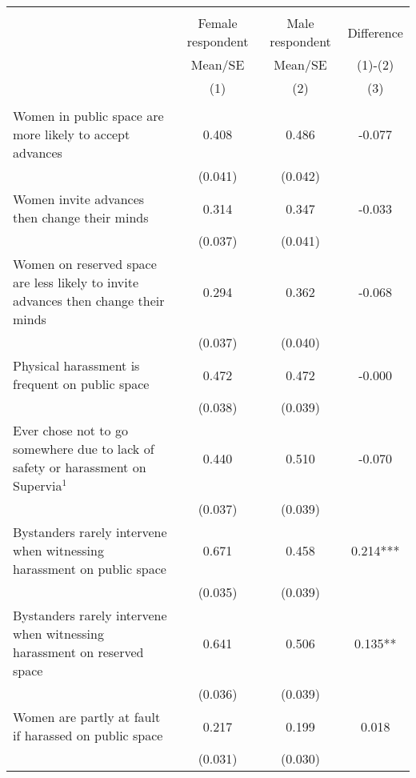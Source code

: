


\begin{tabular}{lccc} \hline\hline \\[-1.8ex]
 & Female respondent & Male respondent & Difference \\
 & Mean/SE & Mean/SE & (1)-(2) \\
 & (1) & (2) & (3) \\ \hline\\[-1.8ex]
Women in public space are more likely to accept advances & 0.408 & 0.486 & -0.077 \\
 & (0.041) & (0.042) &  \\
Women invite advances then change their minds & 0.314 & 0.347 & -0.033 \\
 & (0.037) & (0.041) &  \\
Women on reserved space are less likely to invite advances then change their minds & 0.294 & 0.362 & -0.068 \\
 & (0.037) & (0.040) &  \\
Physical harassment is frequent on public space & 0.472 & 0.472 & -0.000 \\
 & (0.038) & (0.039) &  \\
Ever chose not to go somewhere due to lack of safety or harassment on Supervia$^{1}$ & 0.440 & 0.510 & -0.070 \\
 & (0.037) & (0.039) &  \\
Bystanders rarely intervene when witnessing harassment on public space & 0.671 & 0.458 & 0.214*** \\
 & (0.035) & (0.039) &  \\
Bystanders rarely intervene when witnessing harassment on reserved space & 0.641 & 0.506 & 0.135** \\
 & (0.036) & (0.039) &  \\
Women are partly at fault if harassed on public space & 0.217 & 0.199 & 0.018 \\
 & (0.031) & (0.030) &  \\ \hline
\hline \end{tabular}

